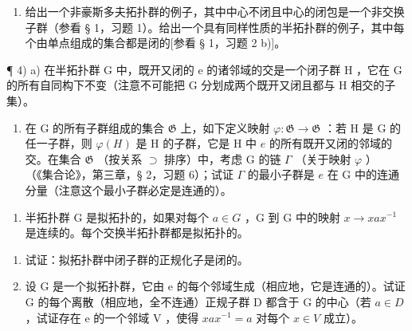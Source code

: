 \begin{enumerate}
\def\labelenumi{\arabic{enumi})}
\setcounter{enumi}{2}
\tightlist
\item
  给出一个非豪斯多夫拓扑群的例子，其中中心不闭且中心的闭包是一个非交换子群（参看 § 1，习题 1）。给出一个具有同样性质的半拓扑群的例子，其中每个由单点组成的集合都是闭的{[}参看 § 1，习题 2 b){]}。
\end{enumerate}

¶ 4) a) 在半拓扑群 G 中，既开又闭的 e 的诸邻域的交是一个闭子群 H ，它在 G 的所有自同构下不变（注意不可能把 G 分划成两个既开又闭且都与 H 相交的子集）。

\begin{enumerate}
\def\labelenumi{\alph{enumi})}
\setcounter{enumi}{1}
\tightlist
\item
  在 G 的所有子群组成的集合 \(\mathfrak{G}\) 上，如下定义映射 \(\varphi: \mathfrak{G} \to \mathfrak{G}\) ：若 H 是 G 的任一子群，则 \(\varphi(H)\) 是 H 的子群，它是 H 中 \(e\) 的所有既开又闭的邻域的交。在集合 \(\mathfrak{G}\) （按关系 \(\supset\) 排序）中，考虑 G 的链 \(\Gamma\) （关于映射 \(\varphi\) ） （《集合论》，第三章，§ 2，习题 6）；试证 \(\Gamma\) 的最小子群是 \(e\) 在 G 中的连通分量（注意这个最小子群必定是连通的）。
\end{enumerate}

\begin{enumerate}
\def\labelenumi{\arabic{enumi})}
\setcounter{enumi}{4}
\tightlist
\item
  半拓扑群 G 是拟拓扑的，如果对每个 \(a \in G\) ，G 到 G 中的映射 \(x \to xax^{-1}\) 是连续的。每个交换半拓扑群都是拟拓扑的。
\end{enumerate}

\begin{enumerate}
\def\labelenumi{\alph{enumi})}
\item
  试证：拟拓扑群中闭子群的正规化子是闭的。
\item
  设 G 是一个拟拓扑群，它由 e 的每个邻域生成（相应地，它是连通的）。试证 G 的每个离散（相应地，全不连通）正规子群 D 都含于 G 的中心（若 \(a \in D\) ，试证存在 e 的一个邻域 V ，使得 \(xax^{-1} = a\) 对每个 \(x \in V\) 成立）。
\end{enumerate}

